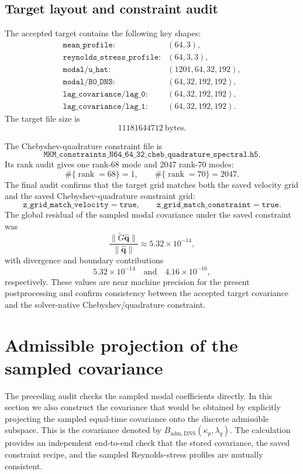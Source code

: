 \documentclass[11pt]{article}
\newcommand{\bfq}{\bm{q}}
\newcommand{\Gtilde}{\widetilde{G}}
\newcommand{\Badm}{B_{\mathrm{adm},\mathrm{DNS}}}
\begin{document}
\subsection{Target layout and constraint audit}

The accepted target contains the following key shapes:
\[
\begin{array}{ll}
\texttt{mean\_profile}: & (64,3),\\
\texttt{reynolds\_stress\_profile}: & (64,3,3),\\
\texttt{modal/u\_hat}: & (1201,64,32,192),\\
\texttt{modal/B0\_DNS}: & (64,32,192,192),\\
\texttt{lag\_covariance/lag\_0}: & (64,32,192,192),\\
\texttt{lag\_covariance/lag\_1}: & (64,32,192,192).
\end{array}
\]
The target file size is
\[
  11181644712\ \text{bytes}.
\]

The Chebyshev-quadrature constraint file is
\[
  \texttt{MKM\_constraints\_N64\_64\_32\_cheb\_quadrature\_spectral.h5}.
\]
Its rank audit gives one rank-68 mode and 2047 rank-70 modes:
\[
  \#\{ \operatorname{rank}=68\}=1,\qquad
  \#\{ \operatorname{rank}=70\}=2047.
\]
The final audit confirms that the target grid matches both the saved velocity
grid and the saved Chebyshev-quadrature constraint grid:
\[
  \texttt{z\_grid\_match\_velocity}=\texttt{true},\qquad
  \texttt{z\_grid\_match\_constraint}=\texttt{true}.
\]
The global residual of the sampled modal covariance under the saved constraint
was
\[
  \frac{\|\Gtilde\widehat{\bfq}\|}{\|\widehat{\bfq}\|}
  \approx 5.32\times 10^{-14},
\]
with divergence and boundary contributions
\[
  5.32\times 10^{-14}
  \quad\text{and}\quad
  4.16\times 10^{-16},
\]
respectively. These values are near machine precision for the present
postprocessing and confirm consistency between the accepted target covariance
and the solver-native Chebyshev/quadrature constraint.

\section{Admissible projection of the sampled covariance}
\label{sec:projected_covariance}

The preceding audit checks the sampled modal coefficients directly. In this
section we also construct the covariance that would be obtained by explicitly
projecting the sampled equal-time covariance onto the discrete admissible
subspace. This is the covariance denoted by
\(\Badm(\kappa_p,\lambda_q)\). The calculation provides an independent
end-to-end check that the stored covariance, the saved constraint recipe, and
the sampled Reynolds-stress profiles are mutually consistent.
\end{document}
